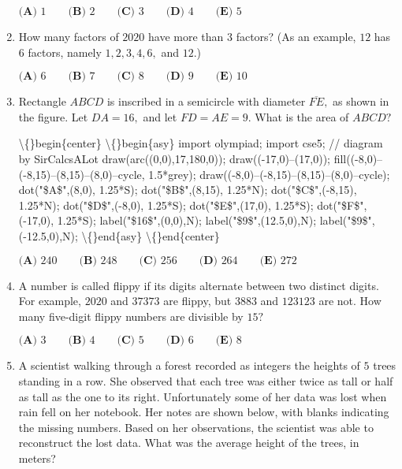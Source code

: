 \documentclass{article}
\begin{document}
\begin{enumerate}[label=\arabic*., itemsep=0.5em]
\(\textbf{(A) }1 \qquad \textbf{(B) }2 \qquad \textbf{(C) }3 \qquad \textbf{(D) }4 \qquad \textbf{(E) }5\)\par \vspace{0.5em}\item How many factors of \(2020\) have more than \(3\) factors? (As an example, \(12\) has \(6\) factors, namely \(1, 2, 3, 4, 6,\) and \(12.\))

\(\textbf{(A) }6 \qquad \textbf{(B) }7 \qquad \textbf{(C) }8 \qquad \textbf{(D) }9 \qquad \textbf{(E) }10\)\par \vspace{0.5em}\item Rectangle \(ABCD\) is inscribed in a semicircle with diameter \(\overline{FE},\) as shown in the figure. Let \(DA=16,\) and let \(FD=AE=9.\) What is the area of \(ABCD?\)


\textbackslash\{\}begin\{center\}
\textbackslash\{\}begin\{asy\}
import olympiad;
import cse5;
// diagram by SirCalcsALot
draw(arc((0,0),17,180,0));
draw((-17,0)--(17,0));
fill((-8,0)--(-8,15)--(8,15)--(8,0)--cycle, 1.5*grey);
draw((-8,0)--(-8,15)--(8,15)--(8,0)--cycle);
dot("\$A\$",(8,0), 1.25*S);
dot("\$B\$",(8,15), 1.25*N);
dot("\$C\$",(-8,15), 1.25*N);
dot("\$D\$",(-8,0), 1.25*S);
dot("\$E\$",(17,0), 1.25*S);
dot("\$F\$",(-17,0), 1.25*S);
label("\$16\$",(0,0),N);
label("\$9\$",(12.5,0),N);
label("\$9\$",(-12.5,0),N);
\textbackslash\{\}end\{asy\}
\textbackslash\{\}end\{center\}


\(\textbf{(A) }240 \qquad \textbf{(B) }248 \qquad \textbf{(C) }256 \qquad \textbf{(D) }264 \qquad \textbf{(E) }272\)\par \vspace{0.5em}\item A number is called flippy if its digits alternate between two distinct digits. For example, \(2020\) and \(37373\) are flippy, but \(3883\) and \(123123\) are not. How many five-digit flippy numbers are divisible by \(15?\)

\(\textbf{(A) }3 \qquad \textbf{(B) }4 \qquad \textbf{(C) }5 \qquad \textbf{(D) }6 \qquad \textbf{(E) }8\)\par \vspace{0.5em}\item A scientist walking through a forest recorded as integers the heights of \(5\) trees standing in a row. She observed that each tree was either twice as tall or half as tall as the one to its right. Unfortunately some of her data was lost when rain fell on her notebook. Her notes are shown below, with blanks indicating the missing numbers. Based on her observations, the scientist was able to reconstruct the lost data. What was the average height of the trees, in meters?



\end{enumerate}
\end{document}

